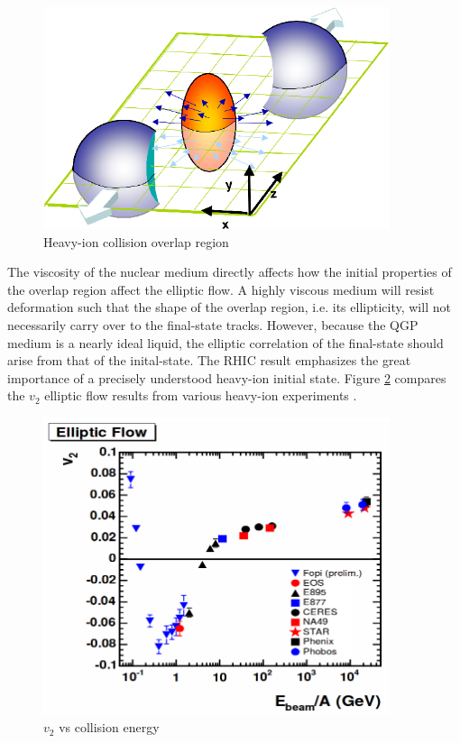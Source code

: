 \begin{figure}[h!]
\begin{centering}
\includegraphics[width=4in]{Chapter1/importfigs/elliptic_flow_3D_medium.png}
\par\end{centering}
\caption{Heavy-ion collision overlap region \label{fig:overlap}}
\end{figure}
The viscosity of the nuclear medium directly affects how the initial properties of the overlap region affect the elliptic flow. A highly viscous medium will resist deformation such that the shape of the overlap region, i.e. its ellipticity, will not necessarily carry over to the final-state tracks. However, because the QGP medium is a nearly ideal liquid, the elliptic correlation of the final-state should arise from that of the inital-state. The RHIC result emphasizes the great importance of a precisely understood heavy-ion initial state. Figure \ref{fig:hiFlow} compares the $v_2$ elliptic flow results from various heavy-ion experiments \cite{spsHI}.
\begin{figure}[h!]
\begin{centering}
\includegraphics[width=4in]{Chapter1/importfigs/elliptic_flow.png}
\par\end{centering}
\caption{$v_2$ vs collision energy \cite{spsHI} \label{fig:hiFlow}}
\end{figure}


